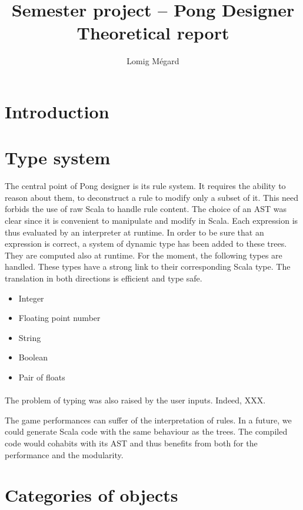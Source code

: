 \documentclass[11pt,a4paper]{article}
\title{Semester project -- Pong Designer\\Theoretical report}
\author{Lomig Mégard}
\begin{document}
\maketitle

\section{Introduction}

\section{Type system}
The central point of Pong designer is its rule system. It requires the ability to reason about them, to deconstruct a rule to modify only a subset of it. This need forbids the use of raw Scala to handle rule content. The choice of an AST was clear since it is convenient to manipulate and modify in Scala. Each expression is thus evaluated by an interpreter at runtime. In order to be sure that an expression is correct, a system of dynamic type has been added to these trees. They are computed also at runtime. For the moment, the following types are handled. These types have a strong link to their corresponding Scala type. The translation in both directions is efficient and type safe.
\begin{itemize}[noitemsep,topsep=2pt,parsep=1pt,partopsep=1pt]
\item Integer
\item Floating point number
\item String
\item Boolean
\item Pair of floats
\end{itemize}

\paragraph*{}
The problem of typing was also raised by the user inputs. Indeed, XXX.

The game performances can suffer of the interpretation of rules. In a future, we could generate Scala code with the same behaviour as the trees. The compiled code would cohabits with its AST and thus benefits from both for the performance and the modularity.

\section{Categories of objects}
\end{document}
